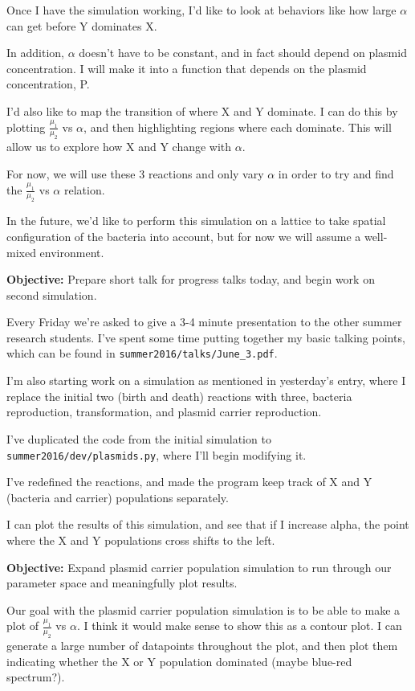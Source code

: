 \documentclass[oneside]{labbook}
\newcommand{\obj}[1]{\textbf{Objective:} #1}
\begin{document}
Once I have the simulation working, I'd like to look at behaviors like how large
$\alpha$ can get before Y dominates X.

In addition, $\alpha$ doesn't have to be
constant, and in fact should depend on plasmid concentration. I will make it into
a function that depends on the plasmid concentration, P.

I'd also like to map the transition of where X and Y dominate. I can do this by
plotting $\frac{\mu_1}{\mu_2}$ vs $\alpha$, and then highlighting regions where
each dominate. This will allow us to explore how X and Y change with $\alpha$.

For now, we will use these 3 reactions and only vary $\alpha$ in order to try
and find the $\frac{\mu_1}{\mu_2}$ vs $\alpha$ relation.

In the future, we'd like to perform this simulation on a lattice to take spatial
configuration of the bacteria into account, but for now we will assume a well-mixed
environment.


\obj{Prepare short talk for progress talks today, and begin work on second
simulation.}

Every Friday we're asked to give a 3-4 minute presentation to the other summer
research students. I've spent some time putting together my basic talking points,
which can be found in \texttt{summer2016/talks/June\_3.pdf}.

I'm also starting work on a simulation as mentioned in yesterday's entry, where
I replace the initial two (birth and death) reactions with three, bacteria
reproduction, transformation, and plasmid carrier reproduction.

I've duplicated the code from the initial simulation to
 \texttt{summer2016/dev/plasmids.py}, where I'll begin modifying it.

I've redefined the reactions, and made the program keep track of X and Y
(bacteria and carrier) populations separately.

I can plot the results of this simulation, and see that if I increase alpha, the
point where the X and Y populations cross shifts to the left.



\obj{Expand plasmid carrier population simulation to run through our parameter
space and meaningfully plot results.}

Our goal with the plasmid carrier population simulation is to be able to make a
plot of $\frac{\mu_1}{\mu_2}$ vs $\alpha$. I think it would make sense to show
this as a contour plot. I can generate a large number of datapoints throughout
the plot, and then plot them indicating whether the X or Y population dominated
(maybe blue-red spectrum?).
\end{document}
